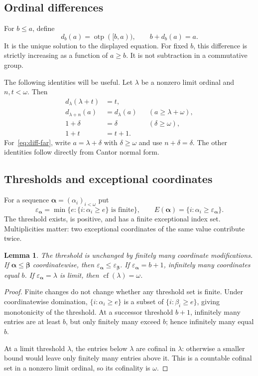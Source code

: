 \documentclass[11pt,letterpaper]{article}
\newtheorem{lemma}[theorem]{Lemma}
\theoremstyle{definition}
\theoremstyle{remark}
\newcommand{\seq}[1]{\boldsymbol{#1}}
\newcommand{\cf}{\operatorname{cf}}
\newcommand{\ot}{\operatorname{otp}}
\newcommand{\epsa}{\varepsilon_{\seq\alpha}}
\newcommand{\epsb}{\varepsilon_{\seq\beta}}
\newcommand{\diff}[2]{d_{#1}(#2)}
\begin{document}
\subsection{Ordinal differences}

For $b\le a$, define
\begin{equation}\label{eq:diff}
 \diff b a=\ot([b,a)),\qquad b+\diff b a=a.
\end{equation}
It is the unique solution to the displayed equation. For fixed $b$, this difference is strictly increasing as a function of $a\ge b$. It is not subtraction in a commutative group.

The following identities will be useful. Let $\lambda$ be a nonzero limit ordinal and $n,t<\omega$. Then
\begin{align}
 \diff{\lambda}{\lambda+t}&=t,\label{eq:diff-near}\\
 \diff{\lambda+n}{a}&=\diff\lambda a
       &&(a\ge\lambda+\omega),\label{eq:diff-far}\\
 1+\delta&=\delta &&(\delta\ge\omega),\label{eq:one-plus-infinite}\\
 1+t&=t+1.\label{eq:one-plus-finite}
\end{align}
For~\eqref{eq:diff-far}, write $a=\lambda+\delta$ with $\delta\ge\omega$ and use $n+\delta=\delta$. The other identities follow directly from Cantor normal form.

\subsection{Thresholds and exceptional coordinates}

For a sequence $\seq\alpha=(\alpha_i)_{i<\omega}$ put
\begin{equation}\label{eq:epsilon}
 \epsa=\min\{e:\{i:\alpha_i\ge e\}\text{ is finite}\},
 \qquad E(\seq\alpha)=\{i:\alpha_i\ge\epsa\}.
\end{equation}
The threshold exists, is positive, and has a finite exceptional index set. Multiplicities matter: two exceptional coordinates of the same value contribute twice.

\begin{lemma}\label{lem:threshold}
The threshold is unchanged by finitely many coordinate modifications. If $\seq\alpha\le\seq\beta$ coordinatewise, then $\epsa\le\epsb$. If $\epsa=b+1$, infinitely many coordinates equal $b$. If $\epsa=\lambda$ is limit, then $\cf(\lambda)=\omega$.
\end{lemma}
\begin{proof}
Finite changes do not change whether any threshold set is finite. Under coordinatewise domination, $\{i:\alpha_i\ge e\}$ is a subset of $\{i:\beta_i\ge e\}$, giving monotonicity of the threshold. At a successor threshold $b+1$, infinitely many entries are at least $b$, but only finitely many exceed $b$; hence infinitely many equal $b$.

At a limit threshold $\lambda$, the entries below $\lambda$ are cofinal in $\lambda$: otherwise a smaller bound would leave only finitely many entries above it. This is a countable cofinal set in a nonzero limit ordinal, so its cofinality is $\omega$.
\end{proof}
\end{document}

